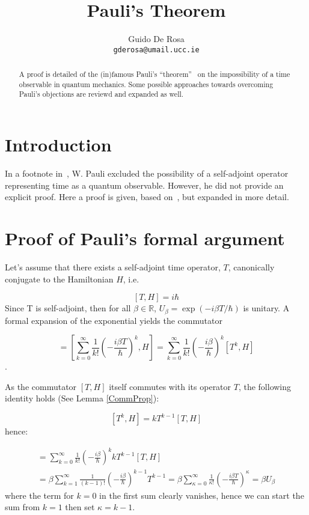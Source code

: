 \documentclass[a4paper]{article}
\author{Guido De Rosa \\ \small\tt{gderosa@umail.ucc.ie}}
\title{Pauli's Theorem}
\begin{document}
\maketitle

\begin{abstract}
A proof is detailed of the (in)famous Pauli's ``theorem''~\cite{PauliFootnote}
on the impossibility of a time observable in quantum mechanics. Some possible
approaches towards overcoming Pauli's objections are reviewd and expanded as well.
\end{abstract}

\section{Introduction}

In a footnote in~\cite{PauliFootnote}, W. Pauli excluded the possibility
of a self-adjoint operator representing time as a quantum observable.
However, he did not provide an explicit proof.
Here a proof is given, based on~\cite{Galapon2002}, but expanded in more detail.

\section{Proof of Pauli's formal argument}\label{proof}

Let's assume that there exists a self-adjoint time operator, $T$, canonically conjugate
to the Hamiltonian $H$, i.e.

\begin{equation}
\label{THcommutator}
[T, H] = i\hbar
\end{equation}
Since T is self-adjoint, then for all
$\beta\in\mathbb{R}$, $U_{\beta} = \exp(- i \beta T / \hbar)$
is unitary. A formal
expansion of the exponential yields the commutator

\begin{equation}
[U_{\beta}, H]  = 
\left[
    \sum_{k=0}^{\infty} \frac{1}{k!} \left(- \frac{i\beta T}{\hbar} \right)^k, H
\right]         =
\sum_{k=0}^{\infty} \frac{1}{k!} \left(- \frac{i\beta}{\hbar} \right)^k [T^k, H]
\end{equation}.

As the commutator $[T, H]$ itself commutes with its operator $T$,
the following identity holds (See Lemma \ref{CommProp}):

$$
[T^k, H] = kT^{k-1}[T, H]
$$
hence:

\begin{multline}
[U_{\beta}, H]  = 
\sum_{k=0}^{\infty} \frac{1}{k!} \left(- \frac{i\beta}{\hbar} \right)^k kT^{k-1}[T, H] \\ =
\beta\sum_{k=1}^{\infty} \frac{1}{(k-1)!} \left(- \frac{i\beta}{\hbar} \right)^{k-1} T^{k-1} =
\beta\sum_{\kappa=0}^{\infty} \frac{1}{\kappa!} \left(- \frac{i\beta T}{\hbar} \right)^{\kappa}  =
\beta U_{\beta}
\end{multline}
where the term for $k=0$ in the first sum clearly vanishes, hence we can start the sum from 
$k=1$ then set $\kappa=k-1$.
\end{document}
